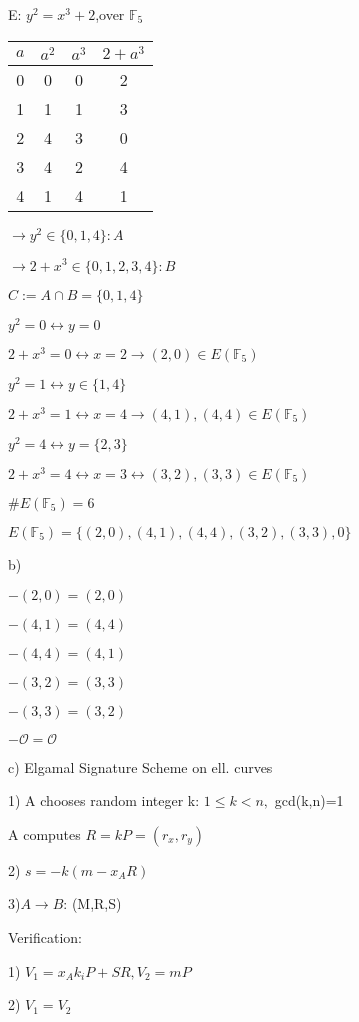 \documentclass[a4paper]{article}
\begin{document}
E: $y^2=x^3+2$,over $\mathbb{F}_5$
\begin{table}[h]
	\centering
	\begin{tabular}{ccc|c}
	$a$ & $a^2$ & $a^3$ & $2+a^3$ \\
	\hline
	0 & 0& 0&2\\
	1&1&1&3\\
	2&4&3&0\\
	3&4&2&4\\
	4&1&4&1
	
	\end{tabular}
\end{table}

$\rightarrow y^2 \in \{0,1,4\}:A$

$\rightarrow 2+x^3 \in \{0,1,2,3,4\}:B$

$C:= A \cap B = \{0,1,4\}$



$y^2 = 0 \leftrightarrow y=0$

$2+x^3 = 0 \leftrightarrow x=2 \rightarrow (2,0) \in E(\mathbb{F}_5)$

$y^2 = 1 \leftrightarrow y \in \{1,4\}$

$2+x^3=1 \leftrightarrow x=4 \rightarrow (4,1),(4,4)\in E(\mathbb{F}_5)$

$y^2=4 \leftrightarrow y = \{2,3\}$

$2+x^3 = 4 \leftrightarrow x=3 \leftrightarrow (3,2),(3,3) \in E(\mathbb{F}_5)$

$\#E(\mathbb{F}_5)=6$

$E(\mathbb{F}_5)=\{(2,0),(4,1),(4,4),(3,2),(3,3),0\}$

b)

$-(2,0)=(2,0)$

$-(4,1)=(4,4)$

$-(4,4)=(4,1)$

$-(3,2)=(3,3)$

$-(3,3)=(3,2)$

$-\mathcal{O}=\mathcal{O}$


c)
Elgamal Signature Scheme on ell. curves

1) A chooses random integer k: $1\leq k < n,$ gcd(k,n)=1

A computes $R=kP=(r_x,r_y)$

2) $s=-k(m-x_AR)$

3)$A\rightarrow B$: (M,R,S)

Verification:

1) $V_1 = x_A k_i P + SR,V_2=mP$

2) $V_1 = V_2$
\end{document}
